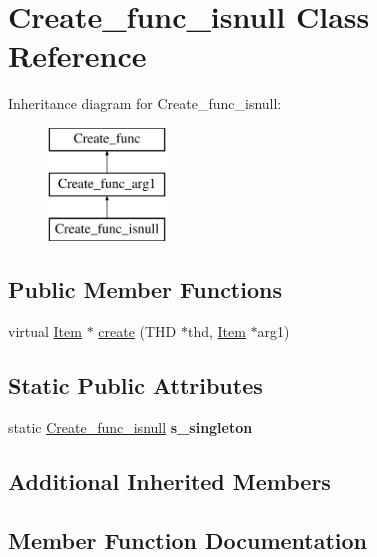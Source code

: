 \hypertarget{classCreate__func__isnull}{}\section{Create\+\_\+func\+\_\+isnull Class Reference}
\label{classCreate__func__isnull}
Inheritance diagram for Create\+\_\+func\+\_\+isnull\+:\begin{figure}[H]
\begin{center}
\leavevmode
\includegraphics[height=3.000000cm]{classCreate__func__isnull}
\end{center}
\end{figure}
\subsection*{Public Member Functions}
\begin{DoxyCompactItemize}
\item 
virtual \mbox{\hyperlink{classItem}{Item}} $\ast$ \mbox{\hyperlink{classCreate__func__isnull_ad4ad8dfbcd99a298f158fd07437c8b89}{create}} (T\+HD $\ast$thd, \mbox{\hyperlink{classItem}{Item}} $\ast$arg1)
\end{DoxyCompactItemize}
\subsection*{Static Public Attributes}
\begin{DoxyCompactItemize}
\item 
\mbox{\label{classCreate__func__isnull_ae1a395314ed6bfac8569622678f70977}} 
static \mbox{\hyperlink{classCreate__func__isnull}{Create\+\_\+func\+\_\+isnull}} {\bfseries s\+\_\+singleton}
\end{DoxyCompactItemize}
\subsection*{Additional Inherited Members}


\subsection{Member Function Documentation}
\mbox{\label{classCreate__func__isnull_ad4ad8dfbcd99a298f158fd07437c8b89}} 
